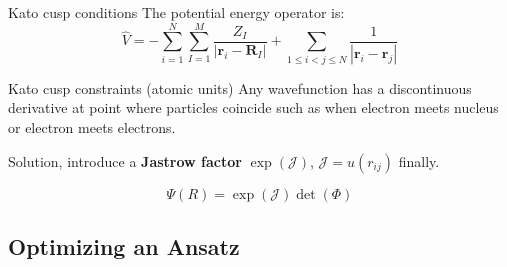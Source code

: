 \documentclass{beamer}
\begin{document}
\begin{frame}{Kato cusp conditions}
The potential energy operator is:
$$
\hat{V}=-\sum_{i=1}^{N}\sum_{I=1}^{M}\frac{Z_I}{|\mathbf r_i-\mathbf R_I|}
+\sum_{1\le i<j\le N}\frac{1}{|\mathbf r_i-\mathbf r_j|}
$$
\begin{block}{Kato cusp constraints (atomic units)}
  Any wavefunction has a discontinuous derivative at point where particles coincide such as when electron meets nucleus or electron meets electrons.
\end{block}

Solution, introduce a \textbf{Jastrow factor} $\exp(\mathcal{J})$, $\mathcal{J}=u(r_{ij})$ finally.

$$
\Psi(R)=\exp(\mathcal{J})\det(\Phi)
$$

\end{frame}




\subsection{Optimizing an Ansatz}

\end{document}
